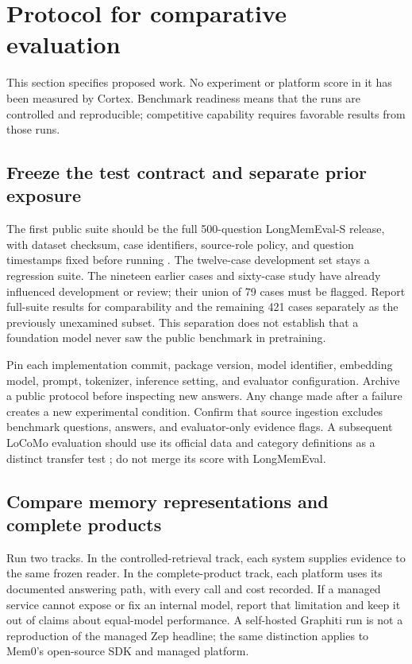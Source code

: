 \section{Protocol for comparative evaluation}
\label{sec:protocol}
This section specifies proposed work. No experiment or platform score in it has been measured by Cortex. Benchmark readiness means that the runs are controlled and reproducible; competitive capability requires favorable results from those runs.

\subsection{Freeze the test contract and separate prior exposure}
The first public suite should be the full 500-question LongMemEval-S release, with dataset checksum, case identifiers, source-role policy, and question timestamps fixed before running \citep{longmem,longmemrepo}. The twelve-case development set stays a regression suite. The nineteen earlier cases and sixty-case study have already influenced development or review; their union of 79 cases must be flagged. Report full-suite results for comparability and the remaining 421 cases separately as the previously unexamined subset. This separation does not establish that a foundation model never saw the public benchmark in pretraining.

Pin each implementation commit, package version, model identifier, embedding model, prompt, tokenizer, inference setting, and evaluator configuration. Archive a public protocol before inspecting new answers. Any change made after a failure creates a new experimental condition. Confirm that source ingestion excludes benchmark questions, answers, and evaluator-only evidence flags. A subsequent LoCoMo evaluation should use its official data and category definitions as a distinct transfer test \citep{locomorepo}; do not merge its score with LongMemEval.

\subsection{Compare memory representations and complete products}
Run two tracks. In the controlled-retrieval track, each system supplies evidence to the same frozen reader. In the complete-product track, each platform uses its documented answering path, with every call and cost recorded. If a managed service cannot expose or fix an internal model, report that limitation and keep it out of claims about equal-model performance. A self-hosted Graphiti run is not a reproduction of the managed Zep headline; the same distinction applies to Mem0's open-source SDK and managed platform.

